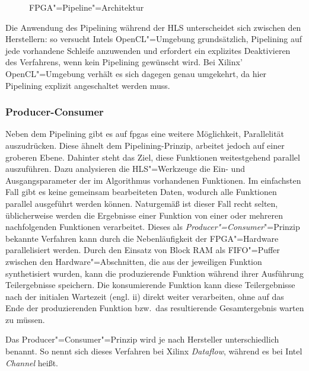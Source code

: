 \begin{figure}[htb]
    \caption{FPGA"=Pipeline"=Architektur \cite[nach][22]{hlsintro2019}}
    \label{fpga:pipelining:pipeline}
\end{figure}

Die Anwendung des Pipelining während der HLS unterscheidet sich zwischen den
Herstellern: so versucht Intels OpenCL"=Umgebung grundsätzlich, Pipelining auf
jede vorhandene Schleife anzuwenden und erfordert ein explizites Deaktivieren
des Verfahrens, wenn kein Pipelining gewünscht wird. Bei Xilinx' OpenCL"=Umgebung
verhält es sich dagegen genau umgekehrt, da hier Pipelining explizit
angeschaltet werden muss.

\subsubsection{Producer-Consumer}

Neben dem Pipelining gibt es auf \gls{fpga}s eine weitere Möglichkeit,
Parallelität auszudrücken. Diese ähnelt dem Pipelining-Prinzip, arbeitet jedoch
auf einer groberen Ebene. Dahinter steht das Ziel, diese Funktionen
weitestgehend parallel auszuführen. Dazu analysieren die HLS"=Werkzeuge die Ein- 
und Ausgangsparameter der im Algorithmus vorhandenen Funktionen. Im einfachsten
Fall gibt es keine gemeinsam bearbeiteten Daten, wodurch alle Funktionen
parallel ausgeführt werden können. Naturgemäß ist dieser Fall recht selten,
üblicherweise werden die Ergebnisse einer Funktion von einer oder mehreren
nachfolgenden Funktionen verarbeitet. Dieses als
\textit{Producer"=Consumer}"=Prinzip bekannte Verfahren kann durch die
Nebenläufigkeit der FPGA"=Hardware parallelisiert werden. Durch den Einsatz von
Block RAM als FIFO"=Puffer zwischen den Hardware"=Abschnitten, die aus der
jeweiligen Funktion synthetisiert wurden, kann die produzierende Funktion
während ihrer Ausführung Teilergebnisse speichern. Die konsumierende Funktion
kann diese Teilergebnisse nach der initialen Wartezeit (engl. \gls{ii}) direkt
weiter verarbeiten, ohne auf das Ende der produzierenden Funktion bzw.\ das
resultierende Gesamtergebnis warten zu müssen. \cite[vgl.][22--23]{hlsintro2019}

Das Producer"=Consumer"=Prinzip wird je nach Hersteller unterschiedlich benannt.
So nennt sich dieses Verfahren bei Xilinx \textit{Dataflow}, während es bei
Intel \textit{Channel} heißt.
